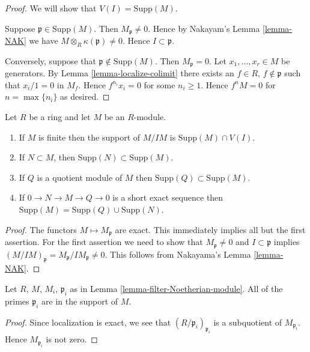 \begin{proof}
We will show that $V(I) = \text{Supp}(M)$.

\medskip\noindent
Suppose $\mathfrak p \in \text{Supp}(M)$.
Then $M_{\mathfrak p} \not = 0$.
Hence by Nakayam's Lemma \ref{lemma-NAK} we have
$M \otimes_R \kappa(\mathfrak p) \not = 0$.
Hence $I \subset \mathfrak p$.

\medskip\noindent
Conversely, suppose that $\mathfrak p \not \in \text{Supp}(M)$.
Then $M_{\mathfrak p} = 0$.
Let $x_1, \ldots, x_r \in M$ be generators.
By Lemma \ref{lemma-localize-colimit} there exists
an $f \in R$, $f\not\in \mathfrak p$ such that
$x_i/1 = 0$ in $M_f$. Hence $f^{n_i} x_i = 0$ for some $n_i \geq 1$.
Hence $f^nM = 0$ for $n = \max\{n_i\}$ as desired.
\end{proof}

\begin{lemma}
\label{lemma-support-quotient}
Let $R$ be a ring and let $M$ be an $R$-module.
\begin{enumerate}
\item If $M$ is finite then the support
of $M/IM$ is $\text{Supp}(M) \cap V(I)$.
\item If $N \subset M$, then $\text{Supp}(N) \subset
\text{Supp}(M)$.
\item If $Q$ is a quotient module of $M$ then $\text{Supp}(Q) \subset
\text{Supp}(M)$.
\item If $0 \to N \to M \to Q \to 0$ is a short exact sequence
then $\text{Supp}(M) = \text{Supp}(Q) \cup
\text{Supp}(N)$.
\end{enumerate}
\end{lemma}

\begin{proof}
The functors $M \mapsto M_{\mathfrak p}$ are exact. This immediately
implies all but the first assertion. For the first assertion
we need to show that $M_\mathfrak p \not = 0$ and
$I \subset \mathfrak p$ implies $(M/IM)_{\mathfrak p}
= M_\mathfrak p/IM_\mathfrak p \not = 0$. This follows
from Nakayama's Lemma \ref{lemma-NAK}.
\end{proof}

\begin{lemma}
\label{lemma-filter-primes-in-support}
Let $R$, $M$, $M_i$, $\mathfrak p_i$ as in
Lemma \ref{lemma-filter-Noetherian-module}.
All of the primes $\mathfrak p_i$ are in the support of
$M$.
\end{lemma}

\begin{proof}
Since localization is exact, we see that
$(R/\mathfrak p_i)_{\mathfrak p_i}$ is a
subquotient of $M_{\mathfrak p_i}$.
Hence $M_{\mathfrak p_i}$ is not zero.
\end{proof}


